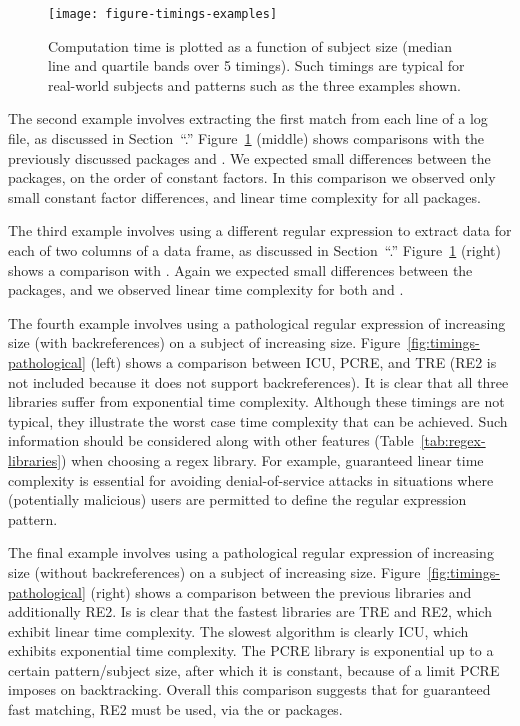\begin{figure}
  \texttt{[image: figure-timings-examples]}
  \vskip -0.5cm
  \caption{\label{fig:timings-examples} Computation time is plotted as
    a function of subject size (median line and quartile bands over 5
    timings). Such timings are typical for real-world subjects and patterns such as the three examples shown. }
\end{figure}

The second example involves extracting the first match from each line
of a log file, as discussed in Section~``\sectionrex.''
Figure~\ref{fig:timings-examples} (middle) shows comparisons with the
previously discussed packages and . We expected
small differences between the packages, on the order of constant
factors. In this comparison we observed only small constant factor
differences, and linear time complexity for all packages.

The third example involves using a different regular expression to
extract data for each of two columns of a data frame, as discussed in
Section~``\sectiontidyr.'' Figure~\ref{fig:timings-examples} (right)
shows a comparison with . Again we expected small
differences between the packages, and we observed linear time
complexity for both  and .

The fourth example involves using a pathological regular expression of
increasing size (with backreferences) on a subject of increasing size.
Figure~\ref{fig:timings-pathological} (left) shows a comparison
between ICU, PCRE, and TRE (RE2 is not included because it does not
support backreferences). It is clear that all three libraries suffer
from exponential time complexity.
Although these timings are not typical, they illustrate
the worst case time complexity that can be achieved. Such information
should be considered along with other features
(Table~\ref{tab:regex-libraries}) when choosing a regex library. For
example, guaranteed linear time complexity is essential for avoiding
denial-of-service attacks in situations where (potentially malicious)
users are permitted to define the regular expression pattern.

The final example involves using a pathological regular expression of
increasing size (without backreferences) on a subject of increasing
size. Figure~\ref{fig:timings-pathological} (right) shows a comparison
between the previous libraries and additionally RE2. Is is clear that
the fastest libraries are TRE and RE2, which exhibit linear time
complexity. The slowest algorithm is clearly ICU, which exhibits
exponential time complexity. The PCRE library is exponential up to a
certain pattern/subject size, after which it is constant, because of a
limit PCRE imposes on backtracking. Overall this comparison suggests
that for guaranteed fast matching, RE2 must be used, via the  or
 packages. 

